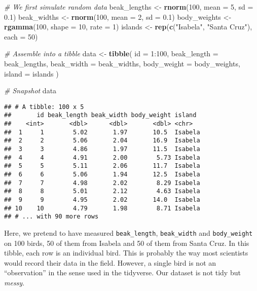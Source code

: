 \documentclass[
]{book}
\newenvironment{Shaded}{}{}
\newcommand{\CommentTok}[1]{\textcolor[rgb]{0.38,0.63,0.69}{\textit{#1}}}
\newcommand{\DataTypeTok}[1]{\textcolor[rgb]{0.56,0.13,0.00}{#1}}
\newcommand{\DecValTok}[1]{\textcolor[rgb]{0.25,0.63,0.44}{#1}}
\newcommand{\FloatTok}[1]{\textcolor[rgb]{0.25,0.63,0.44}{#1}}
\newcommand{\KeywordTok}[1]{\textcolor[rgb]{0.00,0.44,0.13}{\textbf{#1}}}
\newcommand{\NormalTok}[1]{#1}
\newcommand{\OperatorTok}[1]{\textcolor[rgb]{0.40,0.40,0.40}{#1}}
\newcommand{\StringTok}[1]{\textcolor[rgb]{0.25,0.44,0.63}{#1}}
\begin{document}
\begin{Shaded}
\begin{Highlighting}[]
\CommentTok{# We first simulate random data}
\NormalTok{beak_lengths <-}\StringTok{ }\KeywordTok{rnorm}\NormalTok{(}\DecValTok{100}\NormalTok{, }\DataTypeTok{mean =} \DecValTok{5}\NormalTok{, }\DataTypeTok{sd =} \FloatTok{0.1}\NormalTok{)}
\NormalTok{beak_widths <-}\StringTok{ }\KeywordTok{rnorm}\NormalTok{(}\DecValTok{100}\NormalTok{, }\DataTypeTok{mean =} \DecValTok{2}\NormalTok{, }\DataTypeTok{sd =} \FloatTok{0.1}\NormalTok{)}
\NormalTok{body_weights <-}\StringTok{ }\KeywordTok{rgamma}\NormalTok{(}\DecValTok{100}\NormalTok{, }\DataTypeTok{shape =} \DecValTok{10}\NormalTok{, }\DataTypeTok{rate =} \DecValTok{1}\NormalTok{)}
\NormalTok{islands <-}\StringTok{ }\KeywordTok{rep}\NormalTok{(}\KeywordTok{c}\NormalTok{(}\StringTok{"Isabela"}\NormalTok{, }\StringTok{"Santa Cruz"}\NormalTok{), }\DataTypeTok{each =} \DecValTok{50}\NormalTok{)}

\CommentTok{# Assemble into a tibble}
\NormalTok{data <-}\StringTok{ }\KeywordTok{tibble}\NormalTok{(}
  \DataTypeTok{id =} \DecValTok{1}\OperatorTok{:}\DecValTok{100}\NormalTok{,}
  \DataTypeTok{beak_length =}\NormalTok{ beak_lengths, }
  \DataTypeTok{beak_width =}\NormalTok{ beak_widths, }
  \DataTypeTok{body_weight =}\NormalTok{ body_weights,}
  \DataTypeTok{island =}\NormalTok{ islands}
\NormalTok{)}

\CommentTok{# Snapshot}
\NormalTok{data}
\end{Highlighting}
\end{Shaded}

\begin{verbatim}
## # A tibble: 100 x 5
##       id beak_length beak_width body_weight island 
##    <int>       <dbl>      <dbl>       <dbl> <chr>  
##  1     1        5.02       1.97       10.5  Isabela
##  2     2        5.06       2.04       16.9  Isabela
##  3     3        4.86       1.97       11.5  Isabela
##  4     4        4.91       2.00        5.73 Isabela
##  5     5        5.11       2.06       11.7  Isabela
##  6     6        5.06       1.94       12.5  Isabela
##  7     7        4.98       2.02        8.29 Isabela
##  8     8        5.01       2.12        4.63 Isabela
##  9     9        4.95       2.02       14.0  Isabela
## 10    10        4.79       1.98        8.71 Isabela
## # ... with 90 more rows
\end{verbatim}

Here, we pretend to have measured \texttt{beak\_length}, \texttt{beak\_width} and \texttt{body\_weight} on 100 birds, 50 of them from Isabela and 50 of them from Santa Cruz. In this tibble, each row is an individual bird. This is probably the way most scientists would record their data in the field. However, a single bird is not an ``observation'' in the sense used in the tidyverse. Our dataset is not tidy but \emph{messy}.
\end{document}
